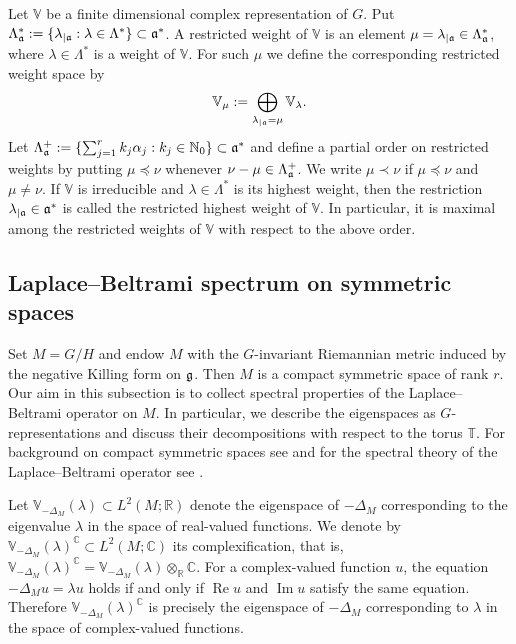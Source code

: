 \documentclass[reqno,twoside,12pt]{amsart}
\newcommand{\bC}{\mathbb{C}}
\newcommand{\bN}{\mathbb{N}}
\newcommand{\bR}{\mathbb{R}}
\newcommand{\bT}{\mathbb{T}}
\newcommand{\bV}{\mathbb{V}}
\numberwithin{equation}{section} \errorcontextlines=0
\begin{document}
Let $\bV$ be a finite dimensional complex representation of $G$. Put
$\Lambda_{\frak a}^*:=\{\lambda_{|\frak a}:\lambda\in\Lambda^*\}\subset\frak a^*$.
A restricted weight of $\bV$ is an element $\mu=\lambda_{|\frak a}\in\Lambda_{\frak a}^*$, where $\lambda\in\Lambda^*$ is a weight of $\bV$. For such $\mu$ we define the corresponding restricted weight space by
\begin{equation}\label{eq:restricted-weight-space}
\bV_\mu:=\bigoplus_{\lambda_{|\frak a}=\mu}\bV_\lambda.
\end{equation}
Let
$
\Lambda_{\frak a}^+:=\{\sum_{j=1}^r k_j\alpha_j:k_j\in\bN_0\}\subset\frak a^*
$
and define a partial order on restricted weights by putting $\mu\preceq\nu$ whenever $\nu-\mu\in\Lambda_{\frak a}^+$. We write $\mu\prec\nu$ if $\mu\preceq\nu$ and $\mu\neq\nu$.
If $\bV$ is irreducible and $\lambda\in\Lambda^*$ is its highest weight, then the restriction $\lambda_{|\frak a}\in\frak a^*$ is called the restricted highest weight of $\bV$. In particular, it is maximal among the restricted weights of $\bV$ with respect to the above order.

\subsection{Laplace--Beltrami spectrum on symmetric spaces}\label{subsec:laplacian}

Set $M=G/H$ and endow $M$ with the $G$-invariant Riemannian metric induced by the negative Killing form on $\frak g$. Then $M$ is a compact symmetric space of rank $r$.
Our aim in this subsection is to collect spectral properties of the Laplace--Beltrami operator on $M$. In particular, we describe the eigenspaces as $G$-representations and discuss their decompositions with respect to the torus $\bT$.
For background on compact symmetric spaces see \cite{HelgasonDiffGeom} and for the spectral theory of the Laplace--Beltrami operator see \cite[Section~5.7]{Gurarie}.


Let $\bV_{-\Delta_M}(\lambda)\subset L^2(M;\bR)$ denote the eigenspace of $-\Delta_M$ corresponding to the eigenvalue $\lambda$ in the space of real-valued functions. We denote by $\bV_{-\Delta_M}(\lambda)^\bC\subset L^2(M;\bC)$ its complexification, that is,
$
\bV_{-\Delta_M}(\lambda)^\bC=\bV_{-\Delta_M}(\lambda)\otimes_\bR\bC.
$
For a complex-valued function $u$, the equation $-\Delta_Mu=\lambda u$ holds if and only if $\operatorname{Re}u$ and $\operatorname{Im}u$ satisfy the same equation. Therefore $\bV_{-\Delta_M}(\lambda)^\bC$ is precisely the eigenspace of $-\Delta_M$ corresponding to $\lambda$ in the space of complex-valued functions.
\end{document}
